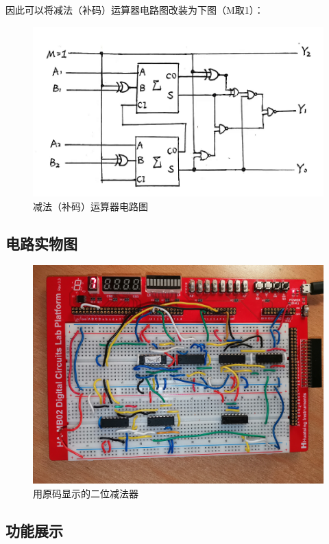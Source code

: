 \documentclass[UTF8]{ctexart}
\begin{document}
{因此可以将减法（补码）运算器电路图改装为下图（M取1）：
\begin{figure}[H]\centering
    {
        \includegraphics[scale=0.5]{5.PNG}
        \caption{减法（补码）运算器电路图}
    }
\end{figure}\par

\subsection{电路实物图}
\begin{figure}[H]\centering
    {
        \includegraphics[scale=0.08]{20.jpg}
        \caption{用原码显示的二位减法器}
    }
\end{figure}\par
\vspace{-2em}
\subsection{功能展示}


}
\end{document}
